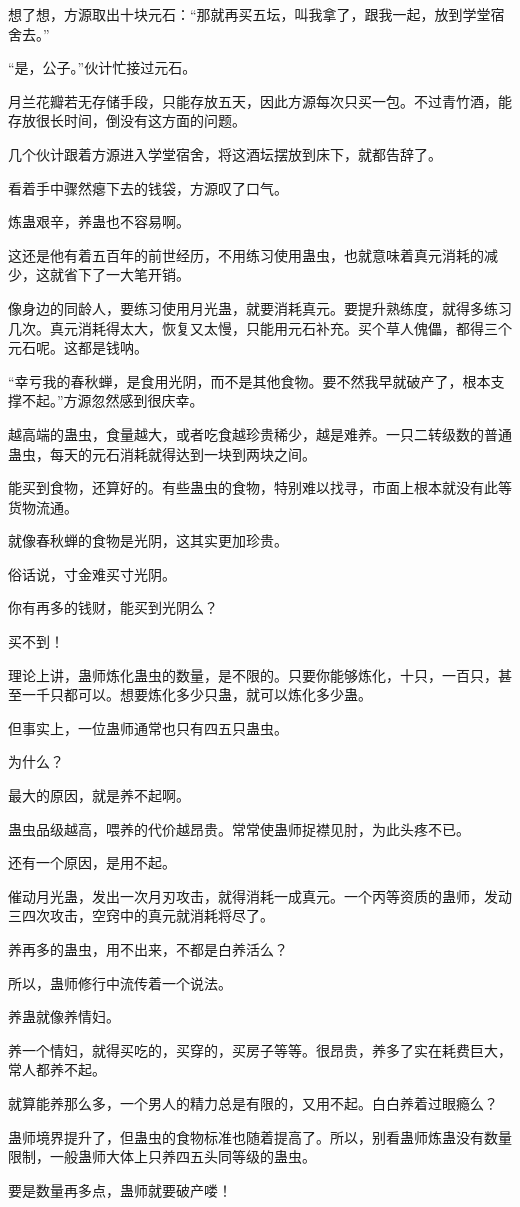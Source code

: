 \begin{this_body}
想了想，方源取出十块元石：“那就再买五坛，叫我拿了，跟我一起，放到学堂宿舍去。”

“是，公子。”伙计忙接过元石。

月兰花瓣若无存储手段，只能存放五天，因此方源每次只买一包。不过青竹酒，能存放很长时间，倒没有这方面的问题。

几个伙计跟着方源进入学堂宿舍，将这酒坛摆放到床下，就都告辞了。

看着手中骤然瘪下去的钱袋，方源叹了口气。

炼蛊艰辛，养蛊也不容易啊。

这还是他有着五百年的前世经历，不用练习使用蛊虫，也就意味着真元消耗的减少，这就省下了一大笔开销。

像身边的同龄人，要练习使用月光蛊，就要消耗真元。要提升熟练度，就得多练习几次。真元消耗得太大，恢复又太慢，只能用元石补充。买个草人傀儡，都得三个元石呢。这都是钱呐。

“幸亏我的春秋蝉，是食用光阴，而不是其他食物。要不然我早就破产了，根本支撑不起。”方源忽然感到很庆幸。

越高端的蛊虫，食量越大，或者吃食越珍贵稀少，越是难养。一只二转级数的普通蛊虫，每天的元石消耗就得达到一块到两块之间。

能买到食物，还算好的。有些蛊虫的食物，特别难以找寻，市面上根本就没有此等货物流通。

就像春秋蝉的食物是光阴，这其实更加珍贵。

俗话说，寸金难买寸光阴。

你有再多的钱财，能买到光阴么？

买不到！

理论上讲，蛊师炼化蛊虫的数量，是不限的。只要你能够炼化，十只，一百只，甚至一千只都可以。想要炼化多少只蛊，就可以炼化多少蛊。

但事实上，一位蛊师通常也只有四五只蛊虫。

为什么？

最大的原因，就是养不起啊。

蛊虫品级越高，喂养的代价越昂贵。常常使蛊师捉襟见肘，为此头疼不已。

还有一个原因，是用不起。

催动月光蛊，发出一次月刃攻击，就得消耗一成真元。一个丙等资质的蛊师，发动三四次攻击，空窍中的真元就消耗将尽了。

养再多的蛊虫，用不出来，不都是白养活么？

所以，蛊师修行中流传着一个说法。

养蛊就像养情妇。

养一个情妇，就得买吃的，买穿的，买房子等等。很昂贵，养多了实在耗费巨大，常人都养不起。

就算能养那么多，一个男人的精力总是有限的，又用不起。白白养着过眼瘾么？

蛊师境界提升了，但蛊虫的食物标准也随着提高了。所以，别看蛊师炼蛊没有数量限制，一般蛊师大体上只养四五头同等级的蛊虫。

要是数量再多点，蛊师就要破产喽！

\end{this_body}

